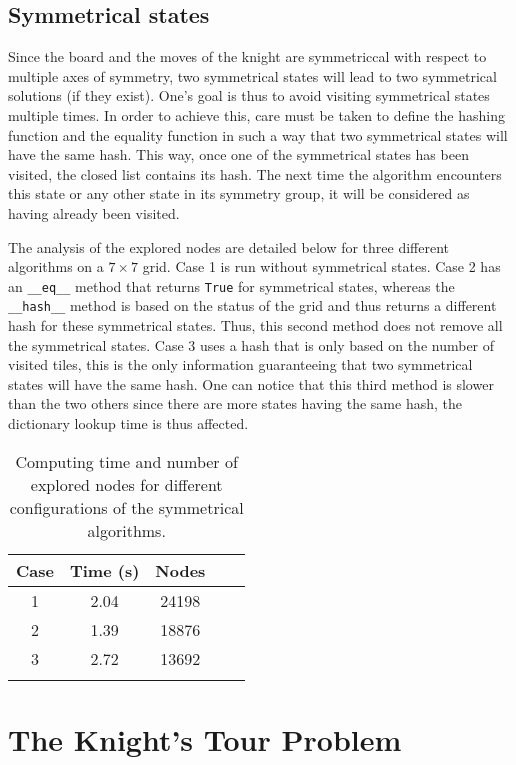 \documentclass[journal]{IEEEtran}
\newcommand{\py}[1]{\texttt{#1}}
\begin{document}
 \subsection{Symmetrical states}
 Since the board and the moves of the knight are symmetriccal with respect to multiple axes of symmetry, two symmetrical states will lead to two symmetrical solutions (if they exist).
 One's goal is thus to avoid visiting symmetrical states multiple times. 
 In order to achieve this, care must be taken to define the hashing function and the equality function in such a way that two symmetrical states will have the same hash.
 This way, once one of the symmetrical states has been visited, the closed list contains its hash.
 The next time the algorithm encounters this state or any other state in its symmetry group, it will be considered as having already been visited.
 
 The analysis of the explored nodes are detailed below for three different algorithms on a $7\times7$ grid.
 Case 1 is run without symmetrical states.
 Case 2 has an \py{__eq__} method that returns \py{True} for symmetrical states, whereas the \py{__hash__} method is based on the status of the grid and thus returns a different hash for these symmetrical states.
 Thus, this second method does not remove all the symmetrical states.
 Case 3 uses a hash that is only based on the number of visited tiles, this is the only information guaranteeing that two symmetrical states will have the same hash. One can notice that this third method is slower than the two others since there are more states having the same hash, the dictionary lookup time is thus affected.
 
\begin{table}[!hbtp]
	\centering
\begin{tabular}{ccccc} 
 \toprule
  Case & Time (\si{\second}) & Nodes\\
  \midrule
 1 & 2.04 & 24198\\
 2 & 1.39 & 18876\\
 3 & 2.72 & 13692\\
 \bottomrule\\
\end{tabular}
\caption{Computing time and number of explored nodes for different configurations of the symmetrical algorithms.}
\end{table}

\section{The Knight’s Tour Problem}
\end{document}
